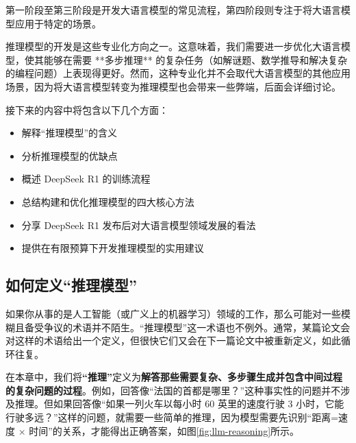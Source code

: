 \documentclass[lang=cn,newtx,10pt,scheme=chinese]{elegantbook}
\begin{document}
第一阶段至第三阶段是开发大语言模型的常见流程，第四阶段则专注于将大语言模型应用于特定的场景。

推理模型的开发是这些专业化方向之一。这意味着，我们需要进一步优化大语言模型，使其能够在需要 **多步推理** 的复杂任务（如解谜题、数学推导和解决复杂的编程问题）上表现得更好。然而，这种专业化并不会取代大语言模型的其他应用场景，因为将大语言模型转变为推理模型也会带来一些弊端，后面会详细讨论。

接下来的内容中将包含以下几个方面：

\begin{itemize}
\item 解释``推理模型''的含义
\item 分析推理模型的优缺点
\item 概述 DeepSeek R1 的训练流程
\item 总结构建和优化推理模型的四大核心方法
\item 分享 DeepSeek R1 发布后对大语言模型领域发展的看法
\item 提供在有限预算下开发推理模型的实用建议
\end{itemize}


\subsection{如何定义``推理模型''}

如果你从事的是人工智能（或广义上的机器学习）领域的工作，那么可能对一些模糊且备受争议的术语并不陌生。``推理模型''这一术语也不例外。通常，某篇论文会对这样的术语给出一个定义，但很快它们又会在下一篇论文中被重新定义，如此循环往复。

在本章中，我们将\textbf{``推理''}定义为\textbf{解答那些需要复杂、多步骤生成并包含中间过程的复杂问题的过程}。例如，回答像``法国的首都是哪里？''这种事实性的问题并不涉及推理。但如果回答像``如果一列火车以每小时 60 英里的速度行驶 3 小时，它能行驶多远？''这样的问题，就需要一些简单的推理，因为模型需要先识别``距离=速度 $\times$ 时间''的关系，才能得出正确答案，如图\ref{fig:llm-reasoning}所示。
\end{document}
